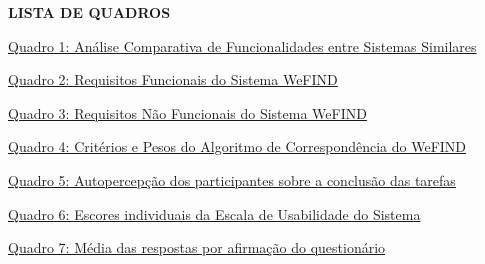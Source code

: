 \thispagestyle{empty}
\begin{center}
    \textbf{\large LISTA DE QUADROS}
\end{center}
\vspace{1.5cm}

\noindent \hyperlink{quadro:similares}{Quadro 1: Análise Comparativa de Funcionalidades entre Sistemas Similares \dotfill \pageref*{quadro:similares}}\par\vspace{0.25cm}
\noindent \hyperlink{quadro:funcionais}{Quadro 2: Requisitos Funcionais do Sistema WeFIND \dotfill \pageref*{quadro:funcionais}}\par\vspace{0.25cm}
\noindent \hyperlink{quadro:nao_funcionais}{Quadro 3: Requisitos Não Funcionais do Sistema WeFIND \dotfill \pageref*{quadro:nao_funcionais}}\par\vspace{0.25cm}
\noindent \hyperlink{quadro:matching}{Quadro 4: Critérios e Pesos do Algoritmo de Correspondência do WeFIND \dotfill \pageref*{quadro:matching}}\par\vspace{0.25cm}
\noindent \hyperlink{quadro:conclusao_tarefas}{Quadro 5: Autopercepção dos participantes sobre a conclusão das tarefas \dotfill \pageref*{quadro:conclusao_tarefas}}\par\vspace{0.25cm}
\noindent \hyperlink{quadro:escores_sus}{Quadro 6: Escores individuais da Escala de Usabilidade do Sistema \dotfill \pageref*{quadro:escores_sus}}\par\vspace{0.25cm}
\noindent \hyperlink{quadro:medias_itens_sus}{Quadro 7: Média das respostas por afirmação do questionário \dotfill \pageref*{quadro:medias_itens_sus}}\par

\clearpage
